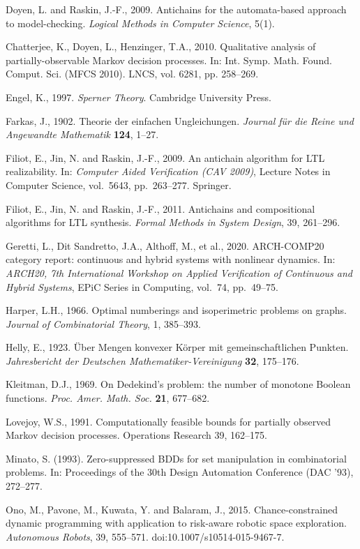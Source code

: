 \documentclass[10pt,twocolumn]{article}
\theoremstyle{plain}
\theoremstyle{definition}
\theoremstyle{remark}
\begin{document}
Doyen, L. and Raskin, J.-F., 2009. Antichains for the automata-based approach to
model-checking. \emph{Logical Methods in Computer Science}, 5(1).

Chatterjee, K., Doyen, L., Henzinger, T.A., 2010. Qualitative analysis of
partially-observable Markov decision processes. In: Int. Symp. Math. Found. Comput. Sci.
(MFCS 2010). LNCS, vol. 6281, pp. 258--269.

Engel, K., 1997. \emph{Sperner Theory}. Cambridge University Press.

Farkas, J., 1902. Theorie der einfachen Ungleichungen. \emph{Journal f\"ur die Reine und
Angewandte Mathematik} \textbf{124}, 1--27.

Filiot, E., Jin, N. and Raskin, J.-F., 2009. An antichain algorithm for LTL
realizability. In: \emph{Computer Aided Verification (CAV 2009)}, Lecture Notes in
Computer Science, vol.~5643, pp.~263--277. Springer.

Filiot, E., Jin, N. and Raskin, J.-F., 2011. Antichains and compositional algorithms
for LTL synthesis. \emph{Formal Methods in System Design}, 39, 261--296.

Geretti, L., Dit Sandretto, J.A., Althoff, M., et al., 2020. ARCH-COMP20 category report:
continuous and hybrid systems with nonlinear dynamics. In: \emph{ARCH20, 7th International
Workshop on Applied Verification of Continuous and Hybrid Systems}, EPiC Series in Computing,
vol.~74, pp.~49--75.

Harper, L.H., 1966. Optimal numberings and isoperimetric problems on graphs.
\emph{Journal of Combinatorial Theory}, 1, 385--393.

Helly, E., 1923. \"Uber Mengen konvexer K\"orper mit gemeinschaftlichen Punkten.
\emph{Jahresbericht der Deutschen Mathematiker-Vereinigung} \textbf{32}, 175--176.

Kleitman, D.J., 1969. On Dedekind's problem: the number of monotone Boolean functions.
\emph{Proc. Amer. Math. Soc.} \textbf{21}, 677--682.

Lovejoy, W.S., 1991. Computationally feasible bounds for partially
observed Markov decision processes. Operations Research 39, 162--175.

Minato, S. (1993). Zero-suppressed BDDs for set manipulation in combinatorial problems. In: Proceedings of the 30th Design Automation Conference (DAC '93), 272--277.

Ono, M., Pavone, M., Kuwata, Y. and Balaram, J., 2015. Chance-constrained dynamic
programming with application to risk-aware robotic space exploration. \emph{Autonomous
Robots}, 39, 555--571. doi:10.1007/s10514-015-9467-7.
\end{document}
